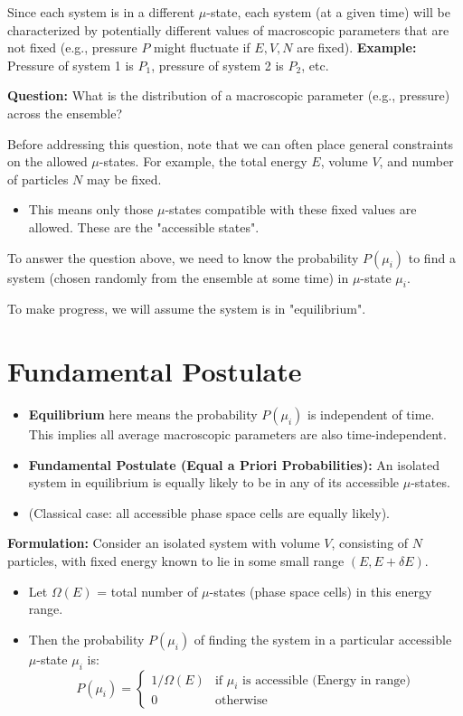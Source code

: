 \documentclass[11pt]{article}
\begin{document}
Since each system is in a different $\mu$-state, each system (at a given time) will be characterized by potentially different values of macroscopic parameters that are not fixed (e.g., pressure $P$ might fluctuate if $E, V, N$ are fixed).
\textbf{Example:} Pressure of system 1 is $P_1$, pressure of system 2 is $P_2$, etc.

\textbf{Question:} What is the distribution of a macroscopic parameter (e.g., pressure) across the ensemble?

Before addressing this question, note that we can often place general constraints on the allowed $\mu$-states. For example, the total energy $E$, volume $V$, and number of particles $N$ may be fixed.
\begin{itemize}
    \item This means only those $\mu$-states compatible with these fixed values are allowed. These are the "accessible states".
\end{itemize}
To answer the question above, we need to know the probability $P(\mu_i)$ to find a system (chosen randomly from the ensemble at some time) in $\mu$-state $\mu_i$.

To make progress, we will assume the system is in "equilibrium".

\section*{Fundamental Postulate}

\begin{itemize}
    \item \textbf{Equilibrium} here means the probability $P(\mu_i)$ is independent of time. This implies all average macroscopic parameters are also time-independent.
    \item \textbf{Fundamental Postulate (Equal a Priori Probabilities):} An isolated system in equilibrium is equally likely to be in any of its accessible $\mu$-states.
    \item (Classical case: all accessible phase space cells are equally likely).
\end{itemize}

\textbf{Formulation:}
Consider an isolated system with volume $V$, consisting of $N$ particles, with fixed energy known to lie in some small range $(E, E+\delta E)$.
\begin{itemize}
    \item Let $\Omega(E)$ = total number of $\mu$-states (phase space cells) in this energy range.
    \item Then the probability $P(\mu_i)$ of finding the system in a particular accessible $\mu$-state $\mu_i$ is:
    \[ P(\mu_i) = \begin{cases} 1 / \Omega(E) & \text{if } \mu_i \text{ is accessible (Energy in range)} \\ 0 & \text{otherwise} \end{cases} \]
\end{itemize}
\end{document}
